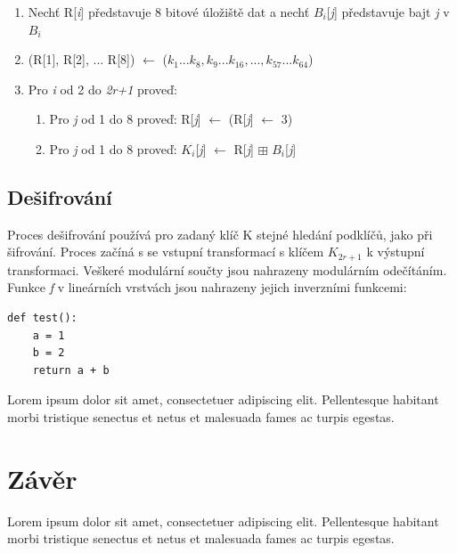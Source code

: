 \documentclass[12pt,a4paper]{article}
\let\oldsection\section
\renewcommand\section{\clearpage\oldsection}
\begin{document}
\begin{enumerate}
\item Nechť R[\emph{i}] představuje 8 bitové úložiště dat a nechť $B_{i}$[\emph{j}] představuje bajt \emph{j} v $B_{i}$
\item (R[1], R[2], ... R[8]) $\leftarrow$ ($k_{1}...k_{8},k_{9}...k_{16},...,k_{57}...k_{64}$)
\item Pro \emph{i} od 2 do \emph{2r+1} proveď: 
\begin{enumerate}
\item Pro \emph{j} od 1 do 8 proveď: R[\emph{j}] $\leftarrow$ (R[\emph{j}] $\leftarrow$ 3)
\item Pro \emph{j} od 1 do 8 proveď: $K_{i}$[\emph{j}] $\leftarrow$ R[\emph{j}] $\boxplus$ $B_{i}$[\emph{j}]
\end{enumerate}
\end{enumerate}

\subsection{Dešifrování}
Proces dešifrování používá pro zadaný klíč K stejné hledání podklíčů, jako při šifrování. Proces začíná s se vstupní transformací s klíčem $K_{2r+1}$ k výstupní transformaci. Veškeré modulární součty jsou nahrazeny modulárním odečítáním.
Funkce \emph{f} v lineárních vrstvách jsou nahrazeny jejich inverzními funkcemi: 

\lstset{language=text} %
\begin{lstlisting}[frame=single]
def test():
	a = 1
	b = 2
	return a + b
\end{lstlisting}
Lorem ipsum dolor sit amet, consectetuer adipiscing elit. Pellentesque habitant morbi tristique senectus et netus et malesuada fames ac turpis egestas.

{\section{Závěr}}
Lorem ipsum dolor sit amet, consectetuer adipiscing elit. Pellentesque habitant morbi tristique senectus et netus et malesuada fames ac turpis egestas.

\end{document}
